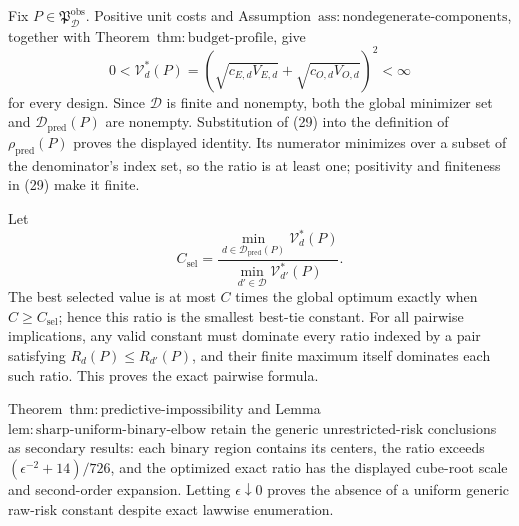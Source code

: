 Fix \(P\in\mathfrak P_{\mathcal D}^{\mathrm{obs}}\).  Positive unit costs and Assumption~\(\mathrm{ass{:}nondegenerate\text{-}components}\), together with Theorem~\(\mathrm{thm{:}budget\text{-}profile}\), give
\[
 0<\mathcal V_d^*(P)
 =\left(\sqrt{c_{E,d}V_{E,d}}+\sqrt{c_{O,d}V_{O,d}}\right)^2
 <\infty                                                     \tag{29}
\]
for every design.  Since \(\mathcal D\) is finite and nonempty, both the global minimizer set and \(\mathcal D_{\mathrm{pred}}(P)\) are nonempty.  Substitution of (29) into the definition of \(\rho_{\mathrm{pred}}(P)\) proves the displayed identity.  Its numerator minimizes over a subset of the denominator's index set, so the ratio is at least one; positivity and finiteness in (29) make it finite.

Let
\[
 C_{\mathrm{sel}}
 =\frac{\min_{d\in\mathcal D_{\mathrm{pred}}(P)}\mathcal V_d^*(P)}
 {\min_{d'\in\mathcal D}\mathcal V_{d'}^*(P)}.
\]
The best selected value is at most \(C\) times the global optimum exactly when \(C\ge C_{\mathrm{sel}}\); hence this ratio is the smallest best-tie constant.  For all pairwise implications, any valid constant must dominate every ratio indexed by a pair satisfying \(R_d(P)\le R_{d'}(P)\), and their finite maximum itself dominates each such ratio.  This proves the exact pairwise formula.

Theorem~\(\mathrm{thm{:}predictive\text{-}impossibility}\) and Lemma~\(\mathrm{lem{:}sharp\text{-}uniform\text{-}binary\text{-}elbow}\) retain the generic unrestricted-risk conclusions as secondary results: each binary region contains its centers, the ratio exceeds \((\epsilon^{-2}+14)/726\), and the optimized exact ratio has the displayed cube-root scale and second-order expansion.  Letting \(\epsilon\downarrow0\) proves the absence of a uniform generic raw-risk constant despite exact lawwise enumeration.